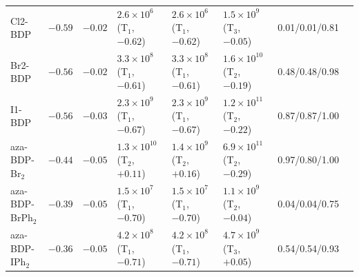 \begin{table}
\begin{tabular}{lrrlllll}
    Cl2-BDP & $-0.59$ & $-0.02$ & $2.6\times10^{6}$ (T$_1$, $-0.62$) & $2.6\times10^{6}$ (T$_1$, $-0.62$) & $1.5\times10^{9}$ (T$_3$, $-0.05$) & 0.01/0.01/0.81 \\
    Br2-BDP & $-0.56$ & $-0.02$ & $3.3\times10^{8}$ (T$_1$, $-0.61$) & $3.3\times10^{8}$ (T$_1$, $-0.61$) & $1.6\times10^{10}$ (T$_2$, $-0.19$) & 0.48/0.48/0.98 \\
    I1-BDP & $-0.56$ & $-0.03$ & $2.3\times10^{9}$ (T$_1$, $-0.67$) & $2.3\times10^{9}$ (T$_1$, $-0.67$) & $1.2\times10^{11}$ (T$_2$, $-0.22$) & 0.87/0.87/1.00 \\
    aza-BDP-Br$_2$ & $-0.44$ & $-0.05$ & $1.3\times10^{10}$ (T$_2$, $+0.11$) & $1.4\times10^{9}$ (T$_2$, $+0.16$) & $6.9\times10^{11}$ (T$_2$, $-0.29$) & 0.97/0.80/1.00 \\
    aza-BDP-BrPh$_2$ & $-0.39$ & $-0.05$ & $1.5\times10^{7}$ (T$_1$, $-0.70$) & $1.5\times10^{7}$ (T$_1$, $-0.70$) & $1.1\times10^{9}$ (T$_2$, $-0.04$) & 0.04/0.04/0.75 \\
    aza-BDP-IPh$_2$ & $-0.36$ & $-0.05$ & $4.2\times10^{8}$ (T$_1$, $-0.71$) & $4.2\times10^{8}$ (T$_1$, $-0.71$) & $4.7\times10^{9}$ (T$_3$, $+0.05$) & 0.54/0.54/0.93 \\
    \bottomrule
  \end{tabular}
\end{table}

